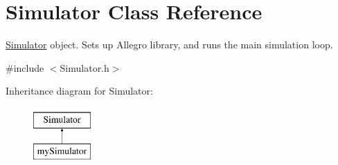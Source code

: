 \hypertarget{class_simulator}{}\section{Simulator Class Reference}
\label{class_simulator}


\mbox{\hyperlink{class_simulator}{Simulator}} object. Sets up Allegro library, and runs the main simulation loop.  




{\ttfamily \#include $<$Simulator.\+h$>$}

Inheritance diagram for Simulator\+:\begin{figure}[H]
\begin{center}
\leavevmode
\includegraphics[height=2.000000cm]{class_simulator}
\end{center}
\end{figure}
